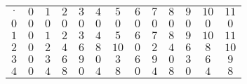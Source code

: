 \documentclass[12pt, a4paper]{article}
\begin{document}
\begin{solution}
\begin{center}
\begin{table}[h]
\begin{tabular}{ccccccccccccc}
\textbf{$\cdot$}          & $0$                      & $1$                       & $2$                       & $3$                      & $4$                      & $5$                       & $6$                      & $7$                       & $8$                      & $9$                      & $10$                      & $11$                      \\ \cline{2-13} 
\multicolumn{1}{c|}{$0$}  & \multicolumn{1}{c|}{$0$} & \multicolumn{1}{c|}{$0$}  & \multicolumn{1}{c|}{$0$}  & \multicolumn{1}{c|}{$0$} & \multicolumn{1}{c|}{$0$} & \multicolumn{1}{c|}{$0$}  & \multicolumn{1}{c|}{$0$} & \multicolumn{1}{c|}{$0$}  & \multicolumn{1}{c|}{$0$} & \multicolumn{1}{c|}{$0$} & \multicolumn{1}{c|}{$0$}  & \multicolumn{1}{c|}{$0$}  \\ \cline{2-13} 
\multicolumn{1}{c|}{$1$}  & \multicolumn{1}{c|}{$0$} & \multicolumn{1}{c|}{$1$}  & \multicolumn{1}{c|}{$2$}  & \multicolumn{1}{c|}{$3$} & \multicolumn{1}{c|}{$4$} & \multicolumn{1}{c|}{$5$}  & \multicolumn{1}{c|}{$6$} & \multicolumn{1}{c|}{$7$}  & \multicolumn{1}{c|}{$8$} & \multicolumn{1}{c|}{$9$} & \multicolumn{1}{c|}{$10$} & \multicolumn{1}{c|}{$11$} \\ \cline{2-13} 
\multicolumn{1}{c|}{$2$}  & \multicolumn{1}{c|}{$0$} & \multicolumn{1}{c|}{$2$}  & \multicolumn{1}{c|}{$4$}  & \multicolumn{1}{c|}{$6$} & \multicolumn{1}{c|}{$8$} & \multicolumn{1}{c|}{$10$} & \multicolumn{1}{c|}{$0$} & \multicolumn{1}{c|}{$2$}  & \multicolumn{1}{c|}{$4$} & \multicolumn{1}{c|}{$6$} & \multicolumn{1}{c|}{$8$}  & \multicolumn{1}{c|}{$10$} \\ \cline{2-13} 
\multicolumn{1}{c|}{$3$}  & \multicolumn{1}{c|}{$0$} & \multicolumn{1}{c|}{$3$}  & \multicolumn{1}{c|}{$6$}  & \multicolumn{1}{c|}{$9$} & \multicolumn{1}{c|}{$0$} & \multicolumn{1}{c|}{$3$}  & \multicolumn{1}{c|}{$6$} & \multicolumn{1}{c|}{$9$}  & \multicolumn{1}{c|}{$0$} & \multicolumn{1}{c|}{$3$} & \multicolumn{1}{c|}{$6$}  & \multicolumn{1}{c|}{$9$}  \\ \cline{2-13} 
\multicolumn{1}{c|}{$4$}  & \multicolumn{1}{c|}{$0$} & \multicolumn{1}{c|}{$4$}  & \multicolumn{1}{c|}{$8$}  & \multicolumn{1}{c|}{$0$} & \multicolumn{1}{c|}{$4$} & \multicolumn{1}{c|}{$8$}  & \multicolumn{1}{c|}{$0$} & \multicolumn{1}{c|}{$4$}  & \multicolumn{1}{c|}{$8$} & \multicolumn{1}{c|}{$0$} & \multicolumn{1}{c|}{$4$}  & \multicolumn{1}{c|}{$8$}  \\ \cline{2-13} 

\end{tabular}
\end{table}
\end{center}
\end{solution}
\end{document}
